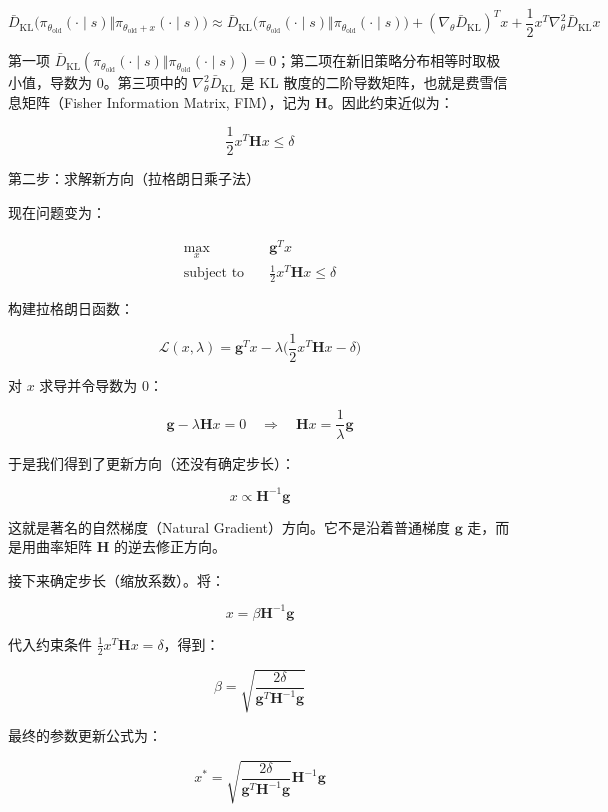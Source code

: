 \[
\bar{D}_{\mathrm{KL}}\bigl(
\pi_{\theta_{\mathrm{old}}}(\cdot\mid s)
\Vert
\pi_{\theta_{\mathrm{old}}+x}(\cdot\mid s)
\bigr)
\approx
\bar{D}_{\mathrm{KL}}\bigl(
\pi_{\theta_{\mathrm{old}}}(\cdot\mid s)
\Vert
\pi_{\theta_{\mathrm{old}}}(\cdot\mid s)
\bigr)
+
(\nabla_\theta \bar{D}_{\mathrm{KL}})^{T} x
+
\frac{1}{2}x^{T}\nabla_\theta^{2}\bar{D}_{\mathrm{KL}}x
\]

第一项 \(\bar{D}_{\mathrm{KL}}(\pi_{\theta_{\mathrm{old}}}(\cdot\mid s)\Vert\pi_{\theta_{\mathrm{old}}}(\cdot\mid s))=0\)；第二项在新旧策略分布相等时取极小值，导数为 \(0\)。第三项中的 \(\nabla_\theta^{2}\bar{D}_{\mathrm{KL}}\) 是 KL 散度的二阶导数矩阵，也就是费雪信息矩阵（Fisher Information Matrix, FIM），记为 \(\mathbf{H}\)。因此约束近似为：

\[
\frac{1}{2}x^{T}\mathbf{H}x\le \delta
\]

第二步：求解新方向（拉格朗日乘子法）

现在问题变为：

\[
\begin{aligned}
\max_x\quad
& \mathbf{g}^{T}x \\
\text{subject to}\quad
& \frac{1}{2}x^{T}\mathbf{H}x\le \delta
\end{aligned}
\]

构建拉格朗日函数：

\[
\mathcal{L}(x,\lambda)=
\mathbf{g}^{T}x
-\lambda
\bigl(
\frac{1}{2}x^{T}\mathbf{H}x-\delta
\bigr)
\]

对 \(x\) 求导并令导数为 \(0\)：

\[
\mathbf{g}-\lambda\mathbf{H}x=0
\quad\Longrightarrow\quad
\mathbf{H}x=\frac{1}{\lambda}\mathbf{g}
\]

于是我们得到了更新方向（还没有确定步长）：

\[
x\propto\mathbf{H}^{-1}\mathbf{g}
\]

这就是著名的自然梯度（Natural Gradient）方向。它不是沿着普通梯度 \(\mathbf{g}\) 走，而是用曲率矩阵 \(\mathbf{H}\) 的逆去修正方向。

接下来确定步长（缩放系数）。将：

\[
x=\beta\mathbf{H}^{-1}\mathbf{g}
\]

代入约束条件 \(\frac{1}{2}x^{T}\mathbf{H}x=\delta\)，得到：

\[
\beta=
\sqrt{
\frac{2\delta}{\mathbf{g}^{T}\mathbf{H}^{-1}\mathbf{g}}
}
\]

最终的参数更新公式为：

\[
x^{*}
=
\sqrt{
\frac{2\delta}{\mathbf{g}^{T}\mathbf{H}^{-1}\mathbf{g}}
}
\mathbf{H}^{-1}\mathbf{g}
\]

